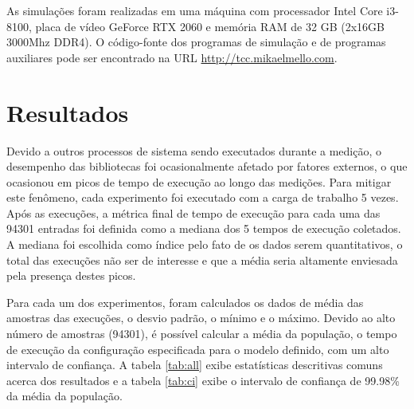 As simulações foram realizadas em uma máquina com processador Intel Core i3-8100, placa de vídeo GeForce RTX 2060 e memória RAM de 32 GB (2x16GB 3000Mhz DDR4). O código-fonte dos programas de simulação e de programas auxiliares pode ser encontrado na URL \url{http://tcc.mikaelmello.com}.

\section{Resultados}

Devido a outros processos de sistema sendo executados durante a medição, o desempenho das bibliotecas foi ocasionalmente afetado por fatores externos, o que ocasionou em picos de tempo de execução ao longo das medições. Para mitigar este fenômeno, cada experimento foi executado com a carga de trabalho 5 vezes. Após as execuções, a métrica final de tempo de execução para cada uma das 94301 entradas foi definida como a mediana dos 5 tempos de execução coletados. A mediana foi escolhida como índice pelo fato de os dados serem quantitativos, o total das execuções não ser de interesse e que a média seria altamente enviesada pela presença destes picos.

Para cada um dos experimentos, foram calculados os dados de média das amostras das execuções, o desvio padrão, o mínimo e o máximo. Devido ao alto número de amostras (94301), é possível calcular a média da população, o tempo de execução da configuração especificada para o modelo definido, com um alto intervalo de confiança. A tabela \ref{tab:all} exibe estatísticas descritivas comuns acerca dos resultados e a tabela \ref{tab:ci} exibe o intervalo de confiança de 99.98\% da média da população.

